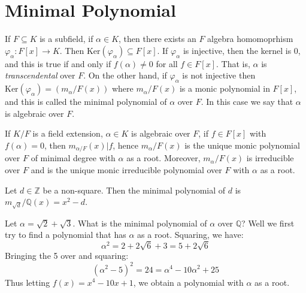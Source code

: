 \documentclass{article}                                                        %
\begin{document}
    \section{Minimal Polynomial}
        If $F\subseteq{K}$ is a subfield, if $\alpha\in{K}$, then there exists
        an $F$ algebra homomoprhism $\varphi_{\alpha}:F[x]\rightarrow{K}$.
        Then $\textrm{Ker}(\varphi_{\alpha})\subseteq{F}[x]$. If
        $\varphi_{\alpha}$ is injective, then the kernel is 0, and this is
        true if and only if $f(\alpha)\ne{0}$ for all $f\in{F}[x]$. That is,
        $\alpha$ is \textit{transcendental} over $F$. On the other hand, if
        $\varphi_{\alpha}$ is not injective then
        $\textrm{Ker}(\varphi_{\alpha})=(m_{\alpha}/F(x))$ where
        $m_{\alpha}/F(x)$ is a monic polynomial in $F[x]$, and this is called
        the minimal polynomial of $\alpha$ over $F$. In this case we say that
        $\alpha$ is algebraic over $F$.
        \begin{theorem}
            If $K/F$ is a field extension, $\alpha\in{K}$ is algebraic over $F$,
            if $f\in{F}[x]$ with $f(\alpha)=0$, then
            $m_{\alpha/F}(x)|f$, hence $m_{\alpha}/F(x)$ is the unique monic
            polynomial over $F$ of minimal degree with $\alpha$ as a root.
            Moreover, $m_{\alpha}/F(x)$ is irreducible over $F$ and is the
            unique monic irreducible polynomial over $F$ with $\alpha$ as a
            root.
        \end{theorem}
        \begin{example}
            Let $d\in\mathbb{Z}$ be a non-square. Then the minimal polynomial of
            $d$ is $m_{\sqrt{d}}/\mathbb{Q}(x)=x^{2}-d$.
        \end{example}
        \begin{example}
            Let $\alpha=\sqrt{2}+\sqrt{3}$. What is the minimal polynomial of
            $\alpha$ over $\mathbb{Q}$? Well we first try to find a polynomial
            that has $\alpha$ as a root. Squaring, we have:
            \begin{equation}
                \alpha^{2}=2+2\sqrt{6}+3=5+2\sqrt{6}
            \end{equation}
            Bringing the 5 over and squaring:
            \begin{equation}
                (\alpha^{2}-5)^{2}=24=\alpha^{4}-10\alpha^{2}+25
            \end{equation}
            Thus letting $f(x)=x^{4}-10x+1$, we obtain a polynomial with
            $\alpha$ as a root.
        \end{example}
\end{document}
